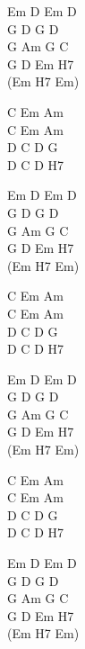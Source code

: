 \begin{chordw}
Em D Em D\\
G D G D\\
G Am G C\\
G D Em H7\\
(Em H7 Em)

C Em Am\\
C Em Am\\
D C D G\\
D C D H7

Em D Em D\\
G D G D\\
G Am G C\\
G D Em H7\\
(Em H7 Em)

C Em Am\\
C Em Am\\
D C D G\\
D C D H7

Em D Em D\\
G D G D\\
G Am G C\\
G D Em H7\\
(Em H7 Em)

C Em Am\\
C Em Am\\
D C D G\\
D C D H7

Em D Em D\\
G D G D\\
G Am G C\\
G D Em H7\\
(Em H7 Em)
\end{chordw}
